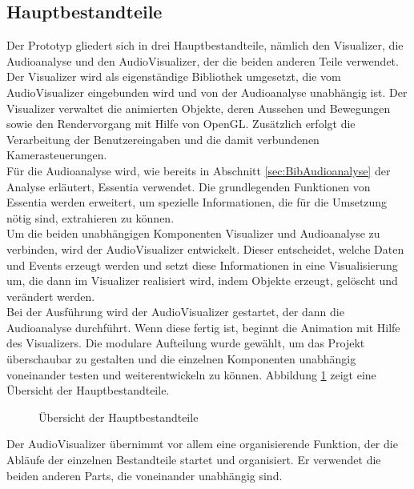 \documentclass[11pt,a4paper]{article}
\begin{document}
\newpage
\subsection{Hauptbestandteile}
Der Prototyp gliedert sich in drei Hauptbestandteile, nämlich den Visualizer, die Audioanalyse und den AudioVisualizer, der die beiden anderen Teile verwendet. Der Visualizer wird als eigenständige Bibliothek umgesetzt, die vom AudioVisualizer eingebunden wird und von der Audioanalyse unabhängig ist. Der Visualizer verwaltet die animierten Objekte, deren Aussehen und Bewegungen sowie den Rendervorgang mit Hilfe von OpenGL. Zusätzlich erfolgt die Verarbeitung der Benutzereingaben und die damit verbundenen Kamerasteuerungen.\\
Für die Audioanalyse wird, wie bereits in Abschnitt \ref{sec:BibAudioanalyse} der Analyse erläutert, Essentia verwendet. Die grundlegenden Funktionen von Essentia werden erweitert, um spezielle Informationen, die für die Umsetzung nötig sind, extrahieren zu können.\\
Um die beiden unabhängigen Komponenten Visualizer und Audioanalyse zu verbinden, wird der AudioVisualizer entwickelt. Dieser entscheidet, welche Daten und Events erzeugt werden und setzt diese Informationen in eine Visualisierung um, die dann im Visualizer realisiert wird, indem Objekte erzeugt, gelöscht und verändert werden.\\
Bei der Ausführung wird der AudioVisualizer gestartet, der dann die Audioanalyse durchführt. Wenn diese fertig ist, beginnt die Animation mit Hilfe des Visualizers. Die modulare Aufteilung wurde gewählt, um das Projekt überschaubar zu gestalten und die einzelnen Komponenten unabhängig voneinander testen und weiterentwickeln zu können. Abbildung \ref{fig:Hauptbestandteile} zeigt eine Übersicht der Hauptbestandteile.

\begin{figure}[!ht]
\centering
{}
\caption[Übersicht der Hauptbestandteile]{Übersicht der Hauptbestandteile}
\label{fig:Hauptbestandteile}
\end{figure}
\noindent
Der AudioVisualizer übernimmt vor allem eine organisierende Funktion, der die Abläufe der einzelnen Bestandteile startet und organisiert. Er verwendet die beiden anderen Parts, die voneinander unabhängig sind.
\end{document}
